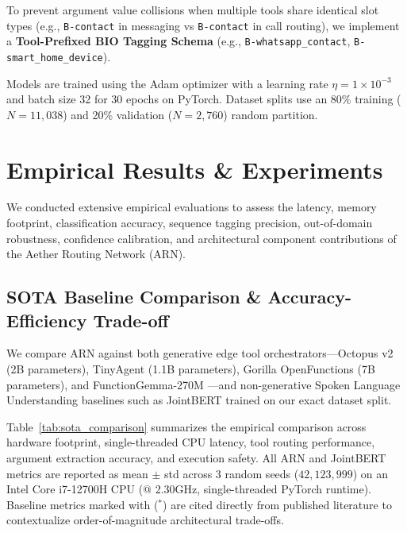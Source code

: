 \documentclass[letterpaper]{article} %
\begin{document}
To prevent argument value collisions when multiple tools share identical slot types (e.g., \texttt{B-contact} in messaging vs \texttt{B-contact} in call routing), we implement a \textbf{Tool-Prefixed BIO Tagging Schema} (e.g., \texttt{B-whatsapp\_contact}, \texttt{B-smart\_home\_device}).

Models are trained using the Adam optimizer \citep{kingma2014adam} with a learning rate $\eta = 1\times 10^{-3}$ and batch size 32 for 30 epochs on PyTorch. Dataset splits use an 80\% training ($N=11,038$) and 20\% validation ($N=2,760$) random partition.


\section{Empirical Results \& Experiments}

We conducted extensive empirical evaluations to assess the latency, memory footprint, classification accuracy, sequence tagging precision, out-of-domain robustness, confidence calibration, and architectural component contributions of the Aether Routing Network (ARN).

\subsection{SOTA Baseline Comparison \& Accuracy-Efficiency Trade-off}
We compare ARN against both generative edge tool orchestrators---Octopus v2 \citep{chen2024octopus} (2B parameters), TinyAgent \citep{zhang2024tinyagent} (1.1B parameters), Gorilla OpenFunctions \citep{patil2023gorilla} (7B parameters), and FunctionGemma-270M \citep{google2025functiongemma}---and non-generative Spoken Language Understanding baselines such as JointBERT \citep{chen2019bert} trained on our exact dataset split.

Table~\ref{tab:sota_comparison} summarizes the empirical comparison across hardware footprint, single-threaded CPU latency, tool routing performance, argument extraction accuracy, and execution safety. All ARN and JointBERT metrics are reported as mean $\pm$ std across 3 random seeds ($42, 123, 999$) on an Intel Core i7-12700H CPU (@ 2.30GHz, single-threaded PyTorch runtime). Baseline metrics marked with ($^*$) are cited directly from published literature to contextualize order-of-magnitude architectural trade-offs.
\end{document}
